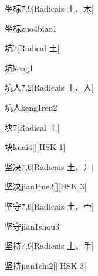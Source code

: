 \begin{entry}{坐标}{7,9}[Radicais ⼟、⽊]
  \begin{phonetics}{坐标}{zuo4biao1}
  \end{phonetics}
\end{entry}

\begin{entry}{坑}{7}[Radical ⼟]
  \begin{phonetics}{坑}{keng1}
  \end{phonetics}
\end{entry}

\begin{entry}{坑人}{7,2}[Radicais ⼟、⼈]
  \begin{phonetics}{坑人}{keng1ren2}
  \end{phonetics}
\end{entry}

\begin{entry}{块}{7}[Radical ⼟]
  \begin{phonetics}{块}{kuai4}[][HSK 1]
  \end{phonetics}
\end{entry}

\begin{entry}{坚决}{7,6}[Radicais ⼟、⼎]
  \begin{phonetics}{坚决}{jian1jue2}[][HSK 3]
  \end{phonetics}
\end{entry}

\begin{entry}{坚守}{7,6}[Radicais ⼟、⼧]
  \begin{phonetics}{坚守}{jian1shou3}
  \end{phonetics}
\end{entry}

\begin{entry}{坚持}{7,9}[Radicais ⼟、⼿]
  \begin{phonetics}{坚持}{jian1chi2}[][HSK 3]
  \end{phonetics}
\end{entry}

